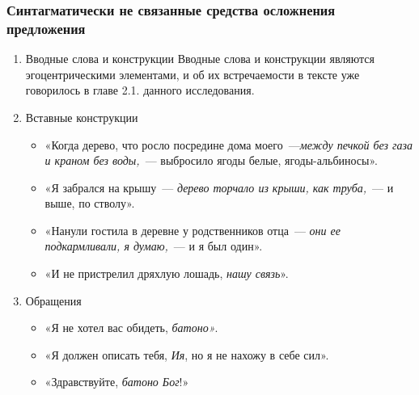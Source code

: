 \documentclass{kursa4}
\begin{document}
      \subsubsection{Синтагматически не связанные средства осложнения предложения}

        \begin{enumerate}
          \item Вводные слова и конструкции \newline
          Вводные слова и конструкции являются эгоцентрическими элементами, и об их встречаемости в тексте уже говорилось в главе 2.1. данного исследования. 

          \item Вставные конструкции \begin{itemize}
            \item «Когда дерево, что росло посредине дома моего~---\textit{между печкой без газа и краном без воды,}~--- выбросило ягоды белые, ягоды-альбиносы». \item «Я забрался на крышу~--- \textit{дерево торчало из крыши, как труба,}~--- и выше, по стволу». \item «Нанули гостила в деревне у родственников отца~--- \textit{они ее подкармливали, я думаю,}~--- и я был один». \item «И не пристрелил дряхлую лошадь, \textit{нашу связь}». \end{itemize}

          \item Обращения \begin{itemize}
            \item «Я не хотел вас обидеть, \textit{батоно»}. \item «Я должен описать тебя, \textit{Ия}, но я не нахожу в себе сил». \item «Здравствуйте, \textit{батоно Бог}!» \end{itemize}
        \end{enumerate}
\end{document}
